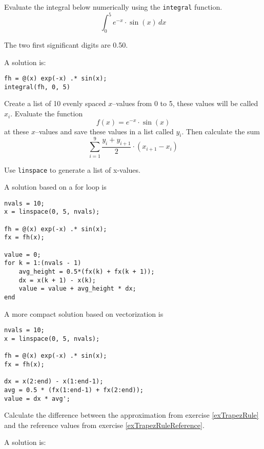 \begin{ex}\label{exTrapezRuleReference}%
Evaluate the integral below numerically using the \verb!integral! function.
\[
\int_0^5 e^{-x} \cdot \sin(x) \, dx
\]
\begin{hint}
The two first significant digits are 0.50.
\end{hint}
\begin{sol}
A solution is:
\begin{verbatim}
fh = @(x) exp(-x) .* sin(x);
integral(fh, 0, 5)
\end{verbatim}
\end{sol}
\end{ex}

\begin{ex}\label{exTrapezRule}%
Create a list of 10 evenly spaced $x$--values from 
0 to 5, these values will be called $x_i$.
Evaluate the function 
\[
f(x) = e^{-x} \cdot \sin(x)
\]
at these $x$--values and save these values in 
a list called $y_i$.
Then calculate the sum
\[
\sum_{i = 1}^{9} \frac{y_i + y_{i + 1}}{2} \cdot (x_{i + 1} - x_i)
\]
\begin{hint}
Use \verb!linspace! to generate a list of x-values.
\end{hint}
\begin{sol}
A solution based on a for loop is
\begin{lstlisting}
nvals = 10;
x = linspace(0, 5, nvals);

fh = @(x) exp(-x) .* sin(x);
fx = fh(x);

value = 0;
for k = 1:(nvals - 1)
    avg_height = 0.5*(fx(k) + fx(k + 1));
    dx = x(k + 1) - x(k);
    value = value + avg_height * dx;
end
\end{lstlisting}

A more compact solution based on vectorization
is 
\begin{lstlisting}
nvals = 10;
x = linspace(0, 5, nvals);

fh = @(x) exp(-x) .* sin(x);
fx = fh(x);

dx = x(2:end) - x(1:end-1);
avg = 0.5 * (fx(1:end-1) + fx(2:end));
value = dx * avg';
\end{lstlisting}
\end{sol}
\end{ex}

\begin{ex}[Error]%
Calculate the difference between the approximation from 
exercise \ref{exTrapezRule} and the reference values from 
exercise \ref{exTrapezRuleReference}.
\begin{hint}
\end{hint}
\begin{sol}
A solution is:
\begin{lstlisting}
\end{lstlisting}
\end{sol}
\end{ex}


